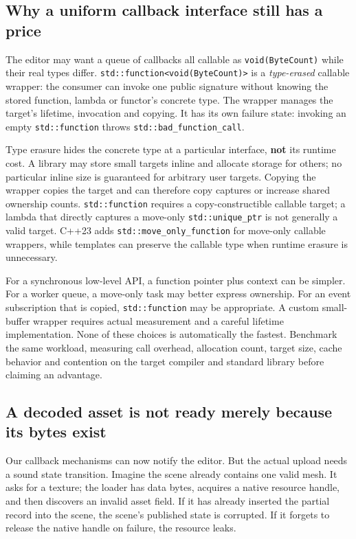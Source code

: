 \subsection{Why a uniform callback interface still has a price}\label{01-foundations-i-ch004-why-a-uniform-callback-interface-still-has-a-price}

The editor may want a queue of callbacks all callable as \texttt{void(ByteCount)} while their real types differ. \texttt{std::function\textless{}void(ByteCount)\textgreater{}} is a \emph{type-erased} callable wrapper: the consumer can invoke one public signature without knowing the stored function, lambda or functor's concrete type. The wrapper manages the target's lifetime, invocation and copying. It has its own failure state: invoking an empty \texttt{std::function} throws \texttt{std::bad\_function\_call}.

Type erasure hides the concrete type at a particular interface, \textbf{not} its runtime cost. A library may store small targets inline and allocate storage for others; no particular inline size is guaranteed for arbitrary user targets. Copying the wrapper copies the target and can therefore copy captures or increase shared ownership counts. \texttt{std::function} requires a copy-constructible callable target; a lambda that directly captures a move-only \texttt{std::unique\_ptr} is not generally a valid target. C++23 adds \texttt{std::move\_only\_function} for move-only callable wrappers, while templates can preserve the callable type when runtime erasure is unnecessary.

For a synchronous low-level API, a function pointer plus context can be simpler. For a worker queue, a move-only task may better express ownership. For an event subscription that is copied, \texttt{std::function} may be appropriate. A custom small-buffer wrapper requires actual measurement and a careful lifetime implementation. None of these choices is automatically the fastest. Benchmark the same workload, measuring call overhead, allocation count, target size, cache behavior and contention on the target compiler and standard library before claiming an advantage.

\subsection{A decoded asset is not ready merely because its bytes exist}\label{01-foundations-i-ch004-a-decoded-asset-is-not-ready-merely-because-its-bytes-exist}

Our callback mechanisms can now notify the editor. But the actual upload needs a sound state transition. Imagine the scene already contains one valid mesh. It asks for a texture; the loader has data bytes, acquires a native resource handle, and then discovers an invalid asset field. If it has already inserted the partial record into the scene, the scene's published state is corrupted. If it forgets to release the native handle on failure, the resource leaks.

